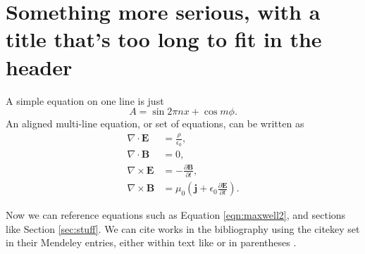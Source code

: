 \chapter{Something more serious, with a title that's too long to fit in the header}



A simple equation on one line is just
\begin{equation}
    A = \sin{2\pi nx} + \cos{m\phi}. \label{eqn:sincos}
\end{equation}
An aligned multi-line equation, or set of equations, can be written as
\begin{align}
\nabla \cdot \bm{E} &= \frac \rho {\epsilon_0},  \label{eqn:maxwell1}\\
\nabla \cdot \bm{B} &= 0,  \label{eqn:maxwell2}\\
\nabla \times \bm{E} &= -\frac{\partial \bm{B}}{\partial t}, \label{eqn:maxwell3}\\
\nabla \times \bm{B} &= \mu_0 \left( \bm{j} + \epsilon_0 \frac{\partial \bm{E}}{\partial t}\right). \label{eqn:maxwell4}
\end{align}

Now we can reference equations such as Equation \ref{eqn:maxwell2}, and sections like Section \ref{sec:stuff}. We can cite works in the bibliography using the citekey set in their Mendeley entries, either within text like \cite{Gauss1838} or in parentheses \citep[e.g.][]{Gauss1838}.